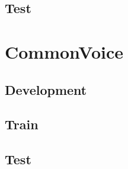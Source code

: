 \subsection{Test}

\section{CommonVoice}
\subsection{Development}
\subsection{Train}
\subsection{Test}



